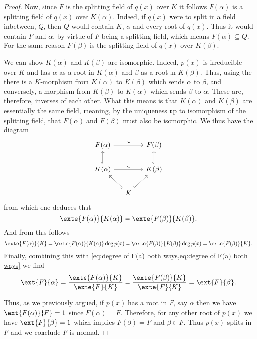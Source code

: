 \documentclass[12pt,oneside]{book}
\begin{document}
\begin{proof}
	Now, since \( F \) is the splitting field of \( q(x) \) over \( K \) it follows \(
	F(\alpha) \) is a splitting field of \( q(x) \) over \( K(\alpha) \). Indeed, if \(
	q(x) \) were to split in a field inbetween, \( Q \), then \( Q \) would contain \(
	K \), \( \alpha \) and every root of \( q(x) \). Thus it would contain \( F \) and \(
	\alpha \), by virtue of \( F \) being a splitting field, which means \( F(\alpha)
	\subseteq Q \). For the same reason \( F(\beta) \) is the splitting field of \( q(x) \)
	over \( K(\beta) \). 
	
	We can show \( K(\alpha) \) and \( K(\beta) \) are isomorphic. Indeed, \(
	p(x) \) is irreducible over \( K \) and has \( \alpha \) as a root in \( K(\alpha) \)
	and \( \beta \) as a root in \( K(\beta) \). Thus, using the  there is a \( K \)-morphism from \( K(\alpha) \) to \( K(\beta) \) which
	sends \( \alpha \) to \( \beta \), and conversely, a morphism from \( K(\beta) \) to \(
	K(\alpha)\) which sends \( \beta \) to \( \alpha \). These are, therefore, inverses of
	each other. What this means is that \( K(\alpha) \) and \( K(\beta) \) are essentially
	the same field, meaning, by the uniqueness up to isomorphism of the splitting field,
	that \( F(\alpha) \) and \( F(\beta) \) must also be isomorphic. We thus have the
	diagram
	\begin{equation*}
		\begin{tikzcd}[column sep = small]
			F(\alpha) \arrow[rr, "\sim"] & & F(\beta) \\
			K(\alpha) \arrow[rr, "\sim"] \arrow[u, hook] & &  K(\beta) \arrow[u, hook] \\
																									 & K \arrow[lu, hook] \arrow[ru, hook] &
		\end{tikzcd}
	\end{equation*}
	from which one deduces that
	\begin{equation*}
		\exte{F(\alpha)}{K(\alpha)} = \exte{F(\beta)}{K(\beta)}.
	\end{equation*}
	And from this follows
	\begin{equation*}
		\exte{F(\alpha)}{K} = \exte{F(\alpha)}{K(\alpha)} \deg{p(x)} =
		\exte{F(\beta)}{K(\beta)} \deg{p(x)} = \exte{F(\beta)}{K}.
	\end{equation*}
	Finally, combining this with \cref{eq:degree of F(a) both ways,eq:degree of F(a) both
	ways} we find
	\begin{equation*}
		\ext{F}{\alpha} = \frac{\exte{F(\alpha)}{K}}{\exte{F}{K}} =
		\frac{\exte{F(\beta)}{K}}{\exte{F}{K}} = \ext{F}{\beta}.
	\end{equation*}
	
	Thus, as we previously argued, if \( p(x) \) has a root in \( F \), say \( \alpha \)
	then we have \( \ext{F(\alpha)}{F} = 1 \) since \( F(\alpha) = F \). Therefore, for any
	other root of \( p(x) \) we have \( \ext{F}{\beta} = 1 \) which implies \( F(\beta) = F
	\) and \( \beta \in F \). Thus \( p(x) \) splits in \( F \) and we conclude \( F \) is
	normal.
\end{proof}
\end{document}
